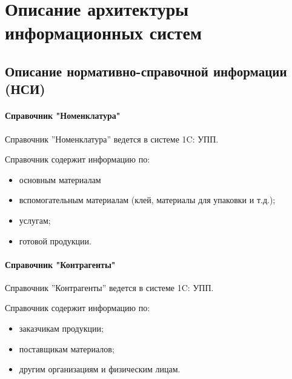 
\newpage

\chapter{Описание архитектуры информационных систем}




\section{Описание нормативно-справочной информации (НСИ)}

\subsubsection{Справочник "Номенклатура"}

Справочник ”Номенклатура” ведется в системе 1C: УПП.



Справочник содержит информацию по:
\begin{itemize}
\item основным материалам %
\item вспомогательным материалам (клей, материалы для упаковки и т.д.);
\item услугам;
\item готовой продукции.
\end{itemize}

\subsubsection{Справочник "Контрагенты"}

Справочник ”Контрагенты” ведется в системе 1C: УПП.

Справочник содержит информацию по:

\begin{itemize}
\item заказчикам продукции;
\item поставщикам материалов;
\item другим организациям и физическим лицам.
\end{itemize}

